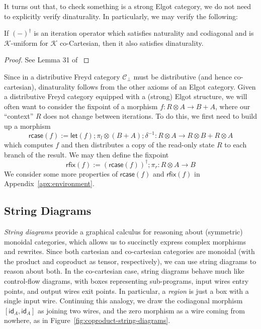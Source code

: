 \documentclass[acmsmall,screen,review]{acmart}
\newcommand{\mc}[1]{\ensuremath{\mathcal{#1}}}
\newcommand{\ms}[1]{\ensuremath{\mathsf{#1}}}
\newcommand{\lmor}[1]{\ms{let}(#1)}
\newcommand{\rcase}[1]{\ms{rcase}(#1)}
\newcommand{\rfix}[1]{\ms{rfix}(#1)}
\begin{document}
It turns out that, to check something is a strong Elgot category, we do not need to
explicitly verify dinaturality. In particularly, we may verify the following:
\begin{proposition}
  If $(-)^\dagger$ is an iteration operator which satisfies naturality and codiagonal and is
  $\mc{K}$-uniform for $\mc{K}$ co-Cartesian, then it also satisfies dinaturality.
\end{proposition}
\begin{proof}
  See Lemma 31 of \citet{goncharov-18-guarded-traced}
\end{proof}
Since in a distributive Freyd category $\mc{C}_\bot$ must be distributive (and hence co-cartesian),
dinaturality follows from the other axioms of an Elgot category.
%
Given a distributive Freyd category equipped with a (strong) Elgot structure, we will often want to
consider the fixpoint of a morphism $f: R \otimes A \to B + A$, where our ``context'' $R$ does not
change between iterations. To do this, we first need to build up a morphism
\begin{equation}
  \rcase{f} := \lmor{f} ; \pi_l \otimes (B + A) ; \delta^{-1} 
    : R \otimes A \to R \otimes B + R \otimes A
\end{equation}
which computes $f$ and then distributes a copy of the read-only state $R$ to each branch of the
result. We may then define the fixpoint
\begin{equation}
  \rfix{f} := (\rcase{f})^\dagger ; \pi_r : R \otimes A \to B
\end{equation}
We consider some more properties of $\rcase{f}$ and $\rfix{f}$ in Appendix~\ref{apx:environment}.

\subsection{String Diagrams}

\emph{String diagrams} provide a graphical calculus for reasoning about (symmetric) monoidal
categories, which allows us to succinctly express complex morphisms and rewrites. Since both
cartesian and co-cartesian categories are monoidal (with the product and coproduct as tensor,
respectively), we can use string diagrams to reason about both. In the co-cartesian case, string
diagrams behave much like control-flow diagrams, with boxes representing sub-programs, input wires
entry points, and output wires exit points. In particular, a \emph{region} is just a box with a
single input wire. Continuing this analogy, we draw the codiagonal morphism $[\ms{id}_A, \ms{id}_A]$
as joining two wires, and the zero morphism as a wire coming from nowhere, as in
Figure~\ref{fig:coproduct-string-diagrams}. 
\end{document}
